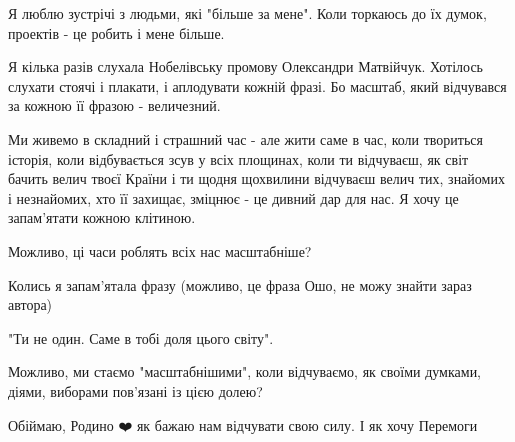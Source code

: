 Я люблю зустрічі з людьми, які "більше за мене". Коли торкаюсь до їх думок,
проектів - це робить і мене більше. 

Я кілька разів слухала Нобелівську промову Олександри Матвійчук. Хотілось
слухати стоячі і плакати, і аплодувати кожній фразі. Бо масштаб, який
відчувався за кожною її фразою - величезний. 

Ми живемо в складний і страшний час - але жити саме в час, коли твориться
історія, коли відбувається зсув у всіх площинах, коли ти відчуваєш, як світ
бачить велич твоєї Країни і ти щодня щохвилини відчуваєш велич тих, знайомих і
незнайомих, хто її захищає, зміцнює -  це дивний дар для нас. Я хочу це
запам'ятати кожною клітиною. 

Можливо, ці часи роблять всіх нас масштабніше? 

Колись я запам'ятала фразу (можливо, це фраза Ошо, не можу знайти зараз автора) 

"Ти не один. Саме в тобі доля цього світу".

Можливо, ми стаємо "масштабнішими", коли відчуваємо, як своїми думками, діями,
виборами пов'язані із цією долею? 

Обіймаю, Родино ❤️ як бажаю нам відчувати свою силу. І як хочу Перемоги

